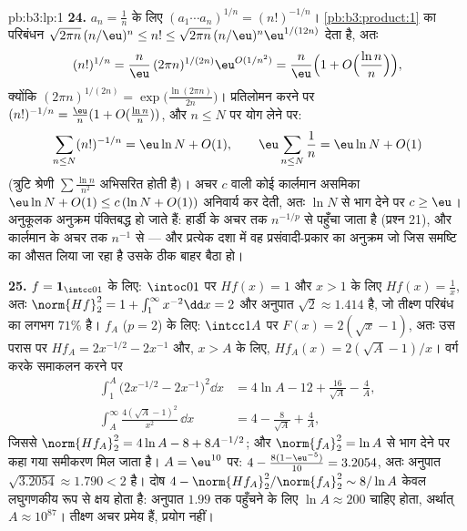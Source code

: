 \begin{solution}{pb:b3:lp:1}
\textbf{24.} $a_n = \frac1n$ के लिए $(a_1\cdots a_n)^{1/n} =
(n!)^{-1/n}$। \cref{pb:b3:product:1} का परिबंधन $\sqrt{2\pi n}\,(n/\eu)^n \leq n! \leq \sqrt{2\pi
n}\,(n/\eu)^n\eu^{1/(12n)}$ देता है, अतः
\[
(n!)^{1/n} = \frac n\eu\,(2\pi n)^{1/(2n)}
\eu^{O(1/n^2)}
= \frac n\eu\Bigl(1 +
O\Bigl(\frac{\ln n}{n}\Bigr)\Bigr),
\]
क्योंकि $(2\pi n)^{1/(2n)} = \exp\bigl(\frac{\ln(2\pi
n)}{2n}\bigr)$। प्रतिलोमन करने पर $(n!)^{-1/n} = \frac\eu n(1 +
O(\frac{\ln n}n))$, और $n \leq N$ पर योग लेने पर:
\[
\sum_{n\leq N}(n!)^{-1/n}
= \eu\ln N + O(1),
\qquad
\eu\sum_{n\leq N}\frac1n = \eu\ln N + O(1)
\]
(त्रुटि श्रेणी $\sum\frac{\ln n}{n^2}$ अभिसरित होती है)। अचर $c$ वाली कोई कार्लमान
असमिका $\eu\ln N
+ O(1) \leq c\,(\ln N + O(1))$ अनिवार्य कर देती, अतः $\ln N$ से भाग देने पर $c \geq \eu$।
अनुकूलक अनुक्रम पंक्तिबद्ध हो जाते हैं: हार्डी के अचर तक $n^{-1/p}$ से
पहुँचा जाता है (प्रश्न 21), और कार्लमान के अचर तक $n^{-1}$ से --- और
प्रत्येक दशा में वह प्रसंवादी-प्रकार का अनुक्रम जो जिस समष्टि का
औसत लिया जा रहा है उसके ठीक बाहर बैठा हो।

\textbf{25.} $f = \mathbf 1_{\intcc01}$ के लिए: $\intoc01$ पर $Hf(x) = 1$ और $x > 1$ के लिए $Hf(x) = \frac1x$,
अतः $\norm{Hf}_2^2 = 1 + \int_1^\infty x^{-2}\dd x = 2$ और अनुपात $\sqrt2 \approx 1.414$ है, जो तीक्ष्ण परिबंध का लगभग $71\%$ है।
$f_A$ ($p = 2$) के लिए: $\intcc1A$ पर $F(x) = 2(\sqrt x - 1)$, अतः उस परास पर $Hf_A = 2x^{-1/2} - 2x^{-1}$ और, $x > A$
के लिए, $Hf_A(x) = 2(\sqrt A - 1)/x$। वर्ग करके समाकलन करने पर
\begin{align*}
\int_1^A\bigl(2x^{-1/2} - 2x^{-1}\bigr)^2\dd x
&= 4\ln A - 12 + \frac{16}{\sqrt A} - \frac4A,\\
\int_A^{\infty}\frac{4(\sqrt A - 1)^2}{x^2}\,\dd x
&= 4 - \frac{8}{\sqrt A} + \frac4A,
\end{align*}
जिससे $\norm{Hf_A}_2^2 = 4\ln A - 8 + 8A^{-1/2}$; और $\norm{f_A}_2^2 = \ln A$ से भाग देने पर कहा गया समीकरण मिल जाता है।
$A
= \eu^{10}$ पर: $4 - \frac{8(1 - \eu^{-5})}{10} = 3.2054$, अतः अनुपात $\sqrt{3.2054} \approx 1.790 < 2$ है। दोष $4 - \norm{Hf_A}_2^2/\norm{f_A}_2^2 \sim 8/\ln A$ केवल लघुगणकीय रूप
से क्षय होता है: अनुपात $1.99$ तक पहुँचने के लिए $\ln A \approx 200$ चाहिए होता,
अर्थात् $A \approx 10^{87}$। तीक्ष्ण अचर प्रमेय हैं, प्रयोग नहीं।
\end{solution}
